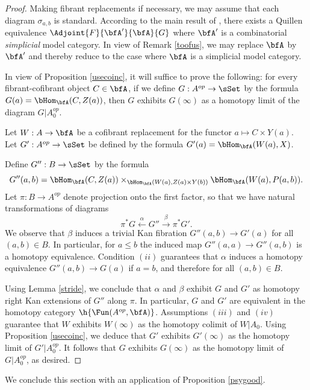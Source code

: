\begin{proof}
Making fibrant replacements if necessary, we may assume that each diagram
$\sigma_{a,b}$ is standard. 
According to the main result of \cite{combmodel}, there exists a Quillen equivalence
$\Adjoint{F}{\bfA'}{\bfA}{G}$ where $\bfA'$ is a combinatorial {\em simplicial} model category.
In view of Remark \ref{toofus}, we may replace $\bfA$ by $\bfA'$
and thereby reduce to the case where $\bfA$ is a simplicial model category. 

In view of Proposition \ref{usecoinc}, it will suffice to prove the following: for every
fibrant-cofibrant object $C \in \bfA$, if we define $G: A^{op} \rightarrow \sSet$
by the formula $G(a) = \bHom_{\bfA}( C, Z(a) )$, then
$G$ exhibits $G(\infty)$ as a homotopy limit of the diagram $G|A_0^{op}$.

Let $W: A \rightarrow \bfA$ be a cofibrant replacement for the functor
$a \mapsto C \times Y(a)$. Let $G': A^{op} \rightarrow \sSet$ be defined
by the formula $G'(a) = \bHom_{\bfA}( W(a), X)$. 

Define $G'': B \rightarrow \sSet$ by the formula
$$ G''(a,b) = \bHom_{\bfA}( C, Z(a) ) \times_{ \bHom_{\bfA}( W(a), Z(a) \times Y(b) ) }
\bHom_{\bfA}( W(a), P(a,b) ).$$
Let $\pi: B \rightarrow A^{op}$ denote projection onto the first factor, so that
we have natural transformations of diagrams
$$ \pi^{\ast} G \stackrel{\alpha}{\leftarrow} G'' \stackrel{\beta}{\rightarrow} \pi^{\ast} G'.$$
We observe that $\beta$ induces a trivial Kan fibration $G''(a,b) \rightarrow G'(a)$
for all $(a,b) \in B$. In particular, for $a \leq b$ the induced map
$G''(a,a) \rightarrow G''(a,b)$ is a homotopy equivalence.
Condition $(ii)$ guarantees that $\alpha$ induces a
homotopy equivalence $G''(a,b) \rightarrow G(a)$ if $a = b$, and therefore for all
$(a,b) \in B$.

Using Lemma \ref{stride}, we conclude that $\alpha$ and $\beta$ exhibit
$G$ and $G'$ as homotopy right Kan extensions of $G''$ along $\pi$. 
In particular, $G$ and $G'$ are equivalent in the homotopy category
$\h{ \Fun( A^{op}, \bfA)}$. Assumptions $(iii)$ and
$(iv)$ guarantee that $W$ exhibits $W(\infty)$ as the homotopy colimit
of $W | A_0$. Using Proposition \ref{usecoinc}, we deduce that
$G'$ exhibits $G'(\infty)$ as the homotopy limit of $G' | A_0^{op}$. 
It follows that $G$ exhibits $G(\infty)$ as the homotopy limit of
$G| A_0^{op}$, as desired.
\end{proof}

We conclude this section with an application of Proposition \ref{psygood}. 

